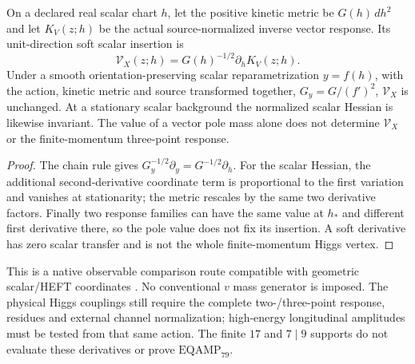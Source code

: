 \documentclass[12pt,a4paper]{article}
\begin{document}
\begin{proposition}
\label{p5c:prop:v2210-lit-scalar-coordinate}
On a declared real scalar chart \(h\), let the positive kinetic metric be
\(G(h)\,dh^2\) and let \(K_V(z;h)\) be the actual source-normalized inverse
vector response.  Its unit-direction soft scalar insertion is
\[
 \mathcal V_X(z;h)=G(h)^{-1/2}\partial_h K_V(z;h).
\]
Under a smooth orientation-preserving scalar reparametrization \(y=f(h)\), with
the action, kinetic metric and source transformed together,
\(G_y=G/(f')^2\), \(\mathcal V_X\) is unchanged.  At a stationary
scalar background the normalized scalar Hessian is likewise invariant.
The value of a vector pole mass alone does not determine
\(\mathcal V_X\) or the finite-momentum three-point response.
\end{proposition}
\begin{proof}
The chain rule gives
\(G_y^{-1/2}\partial_y=G^{-1/2}\partial_h\).
For the scalar Hessian, the additional second-derivative coordinate term
is proportional to the first variation and vanishes at stationarity; the
metric rescales by the same two derivative factors.  Finally two response
families can have the same value at \(h_*\) and different first derivative
there, so the pole value does not fix its insertion.  A soft derivative has
zero scalar transfer and is not the whole finite-momentum Higgs vertex.
\end{proof}
This is a native observable comparison route compatible with geometric
scalar/HEFT coordinates \cite{LitSMScalarGeometry2016,LitSMHEFT2014}.
No conventional \(v\) mass generator is imposed.  The physical Higgs
couplings still require the complete two-/three-point response, residues
and external channel normalization; high-energy longitudinal amplitudes
must be tested from that same action.  The finite \(17\) and \(7\mid9\)
supports do not evaluate these derivatives or prove
\(\mathrm{EQAMP}_{79}\).
\end{document}
